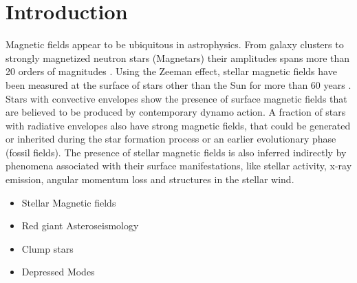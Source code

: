 \section{Introduction}
\label{intro}
Magnetic fields appear to be ubiquitous in astrophysics. From  galaxy clusters to strongly magnetized neutron stars (Magnetars) their amplitudes spans more than 20 orders of magnitudes \cite{Brandenburg_2005}. Using the Zeeman effect, stellar magnetic fields have been measured at the surface of stars other than the Sun for more than 60 years \cite{Babcock_1947}. 
Stars with convective envelopes show the presence of surface magnetic fields that are believed to be produced by contemporary dynamo action. A fraction of stars with radiative envelopes also have strong magnetic fields, that could be generated or inherited during the star formation process or an earlier evolutionary phase (fossil fields).
The presence of  stellar magnetic fields is also inferred indirectly by phenomena associated with their surface manifestations, like stellar activity, x-ray emission, angular momentum loss and structures in the stellar wind. 



\begin{itemize}
\item Stellar Magnetic fields
\item Red giant Asteroseismology
\item Clump stars
\item Depressed Modes
\end{itemize}


  